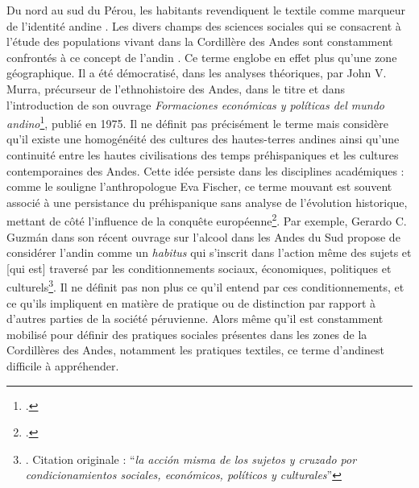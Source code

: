 Du nord au sud du Pérou, les habitants revendiquent le textile comme marqueur de l'identité \og andine \fg. 
Les divers champs des sciences sociales qui se consacrent à l'étude des populations vivant dans la Cordillère des Andes sont constamment confrontés à ce concept de \og l'andin \fg. Ce terme englobe en effet plus qu'une zone géographique. Il a  été démocratisé, dans les analyses théoriques,  par John V. Murra, précurseur de l'ethnohistoire des Andes, dans le titre et dans l'introduction de son ouvrage \textit{Formaciones económicas y políticas del mundo andino}\footcite[p.~22]{murraFormacionesEconomicasPoliticas1975}, publié en 1975. Il ne définit pas précisément le terme mais considère qu'il existe une homogénéité des cultures des hautes-terres andines ainsi qu'une continuité entre les hautes civilisations des temps préhispaniques et les cultures contemporaines des Andes. Cette idée persiste dans les disciplines académiques : comme le souligne l'anthropologue Eva Fischer, ce terme mouvant est souvent associé à une persistance du préhispanique sans analyse de l'évolution historique, mettant de côté l'influence de la conquête européenne\footcite[Partie 1, chapitre 1]{fischerUrdiendoTejidoSocial2008}. Par exemple, Gerardo C. Guzmán dans son récent ouvrage sur l'alcool dans les Andes du Sud propose de considérer \og l'andin \fg \:comme un \textit{habitus} qui s'inscrit dans \og l'action même des sujets et [qui est] traversé par les conditionnements sociaux, économiques, politiques et culturels\fg \footnote{\cite[p.~28]{castilloguzmanAlcoholAndinoEmbriaguez2015}. Citation originale : \textquotedblleft \textit{la acción misma de los sujetos y cruzado por condicionamientos sociales, económicos, políticos y culturales}\textquotedblright}. Il ne définit pas non plus ce qu'il entend par ces conditionnements, et ce qu'ils impliquent en matière de pratique ou de distinction par rapport à d'autres parties de la société péruvienne. Alors même qu'il est constamment mobilisé pour définir des pratiques sociales présentes dans les zones de la Cordillères des Andes, notamment les pratiques textiles, ce terme \og d'andin\fg \:est difficile à appréhender.


